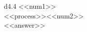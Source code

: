 
\begin{tabular}{d{4.4}}
    <<num1>> \\
    <<process>>\enspace<<num2>> \\
    \hline
    <<answer>> \\
    \hline\\
\end{tabular}





